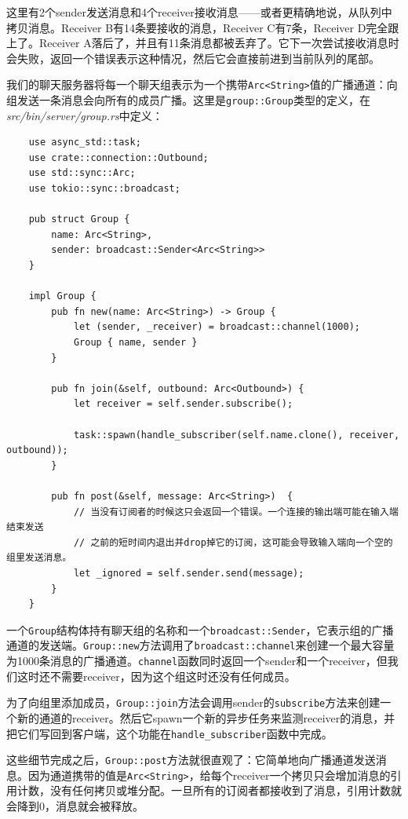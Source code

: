 这里有2个sender发送消息和4个receiver接收消息——或者更精确地说，从队列中拷贝消息。Receiver B有14条要接收的消息，Receiver C有7条，Receiver D完全跟上了。Receiver A落后了，并且有11条消息都被丢弃了。它下一次尝试接收消息时会失败，返回一个错误表示这种情况，然后它会直接前进到当前队列的尾部。

我们的聊天服务器将每一个聊天组表示为一个携带\texttt{Arc<String>}值的广播通道：向组发送一条消息会向所有的成员广播。这里是\texttt{group::Group}类型的定义，在\emph{src/bin/server/group.rs}中定义：
\begin{verbatim}
    use async_std::task;
    use crate::connection::Outbound;
    use std::sync::Arc;
    use tokio::sync::broadcast;

    pub struct Group {
        name: Arc<String>,
        sender: broadcast::Sender<Arc<String>>
    }

    impl Group {
        pub fn new(name: Arc<String>) -> Group {
            let (sender, _receiver) = broadcast::channel(1000);
            Group { name, sender }
        }

        pub fn join(&self, outbound: Arc<Outbound>) {
            let receiver = self.sender.subscribe();

            task::spawn(handle_subscriber(self.name.clone(), receiver, outbound));
        }

        pub fn post(&self, message: Arc<String>)  {
            // 当没有订阅者的时候这只会返回一个错误。一个连接的输出端可能在输入端结束发送
            // 之前的短时间内退出并drop掉它的订阅，这可能会导致输入端向一个空的组里发送消息。
            let _ignored = self.sender.send(message);
        }
    }
\end{verbatim}

一个\texttt{Group}结构体持有聊天组的名称和一个\texttt{broadcast::Sender}，它表示组的广播通道的发送端。\texttt{Group::new}方法调用了\texttt{broadcast::channel}来创建一个最大容量为1000条消息的广播通道。\texttt{channel}函数同时返回一个sender和一个receiver，但我们这时还不需要receiver，因为这个组这时还没有任何成员。

为了向组里添加成员，\texttt{Group::join}方法会调用sender的\texttt{subscribe}方法来创建一个新的通道的receiver。然后它spawn一个新的异步任务来监测receiver的消息，并把它们写回到客户端，这个功能在\texttt{handle\_subscriber}函数中完成。

这些细节完成之后，\texttt{Group::post}方法就很直观了：它简单地向广播通道发送消息。因为通道携带的值是\texttt{Arc<String>}，给每个receiver一个拷贝只会增加消息的引用计数，没有任何拷贝或堆分配。一旦所有的订阅者都接收到了消息，引用计数就会降到0，消息就会被释放。

